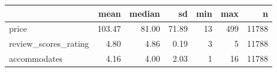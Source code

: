
\begin{tabular}{lrrrrrr}
\toprule
  & mean & median & sd & min & max & n\\
\midrule
price & 103.47 & 81.00 & 71.89 & 13 & 499 & 11788\\
review\_scores\_rating & 4.80 & 4.86 & 0.19 & 3 & 5 & 11788\\
accommodates & 4.16 & 4.00 & 2.03 & 1 & 16 & 11788\\
\bottomrule
\end{tabular}
